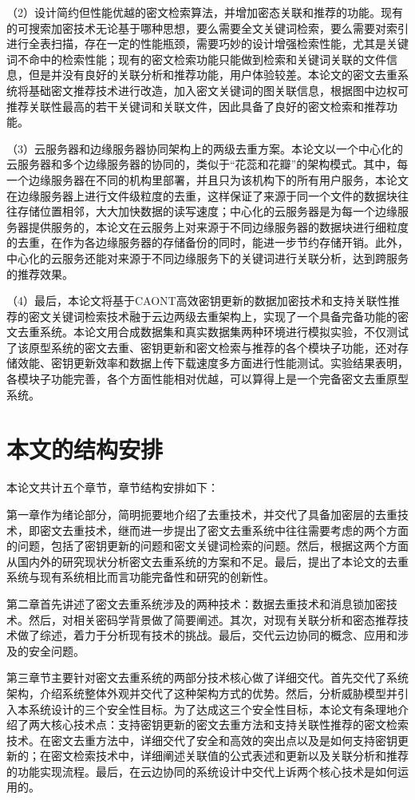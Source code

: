 \documentclass[promaster]{thesis-uestc}
\begin{document}
（2）设计简约但性能优越的密文检索算法，并增加密态关联和推荐的功能。现有的可搜索加密技术无论基于哪种思想，要么需要全文关键词检索，要么需要对索引进行全表扫描，存在一定的性能瓶颈，需要巧妙的设计增强检索性能，尤其是关键词不命中的检索性能；现有的密文检索功能只能做到检索和关键词关联的文件信息，但是并没有良好的关联分析和推荐功能，用户体验较差。本论文的密文去重系统将基础密文推荐技术进行改造，加入密文关键词的图关联信息，根据图中边权可推荐关联性最高的若干关键词和关联文件，因此具备了良好的密文检索和推荐功能。

（3）云服务器和边缘服务器协同架构上的两级去重方案。本论文以一个中心化的云服务器和多个边缘服务器的协同的，类似于“花蕊和花瓣”的架构模式。其中，每一个边缘服务器在不同的机构里部署，并且只为该机构下的所有用户服务，本论文在边缘服务器上进行文件级粒度的去重，这样保证了来源于同一个文件的数据块往往存储位置相邻，大大加快数据的读写速度；中心化的云服务器是为每一个边缘服务器提供服务的，本论文在云服务上对来源于不同边缘服务器的数据块进行细粒度的去重，在作为各边缘服务器的存储备份的同时，能进一步节约存储开销。此外，中心化的云服务还能对来源于不同边缘服务下的关键词进行关联分析，达到跨服务的推荐效果。

（4）最后，本论文将基于CAONT高效密钥更新的数据加密技术和支持关联性推荐的密文关键词检索技术融于云边两级去重架构上，实现了一个具备完备功能的密文去重系统。本论文用合成数据集和真实数据集两种环境进行模拟实验，不仅测试了该原型系统的密文去重、密钥更新和密文检索与推荐的各个模块子功能，还对存储效能、密钥更新效率和数据上传下载速度多方面进行性能测试。实验结果表明，各模块子功能完善，各个方面性能相对优越，可以算得上是一个完备密文去重原型系统。


\section{本文的结构安排}
本论文共计五个章节，章节结构安排如下：

第一章作为绪论部分，简明扼要地介绍了去重技术，并交代了具备加密层的去重技术，即密文去重技术，继而进一步提出了密文去重系统中往往需要考虑的两个方面的问题，包括了密钥更新的问题和密文关键词检索的问题。然后，根据这两个方面从国内外的研究现状分析密文去重系统的方案和不足。最后，提出了本论文的去重系统与现有系统相比而言功能完备性和研究的创新性。

第二章首先讲述了密文去重系统涉及的两种技术：数据去重技术和消息锁加密技术。然后，对相关密码学背景做了简要阐述。其次，对现有关联分析和密态推荐技术做了综述，着力于分析现有技术的挑战。最后，交代云边协同的概念、应用和涉及的安全问题。

第三章节主要针对密文去重系统的两部分技术核心做了详细交代。首先交代了系统架构，介绍系统整体外观并交代了这种架构方式的优势。然后，分析威胁模型并引入本系统设计的三个安全性目标。为了达成这三个安全性目标，本论文有条理地介绍了两大核心技术点：支持密钥更新的密文去重方法和支持关联性推荐的密文检索技术。在密文去重方法中，详细交代了安全和高效的突出点以及是如何支持密钥更新的；在密文检索技术中，详细阐述关联值的公式表述和更新以及关联分析和推荐的功能实现流程。最后，在云边协同的系统设计中交代上诉两个核心技术是如何运用的。
\end{document}
